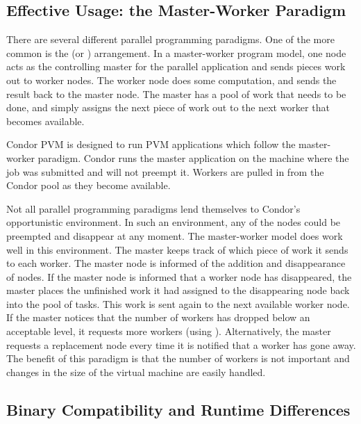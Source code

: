 \subsection{Effective Usage: the Master-Worker Paradigm}

There are several different parallel programming paradigms.  One of the
more common is the  (or )
arrangement.  In a master-worker program model, one node acts as the
controlling master for the parallel application and sends pieces work 
out to worker nodes.
The worker node does some computation, and sends the result back to the
master node.  The master has a pool of work that needs to be
done, and simply assigns the next piece of work out to the next worker
that becomes available.  

Condor PVM is designed to run PVM applications which follow the
master-worker paradigm.  Condor runs the master application on the
machine where the job was submitted and will not preempt it.  Workers
are pulled in from the Condor pool as they become available.

Not all parallel programming paradigms lend themselves to Condor's
opportunistic environment. In such an environment, any of the nodes
could be preempted and disappear at any moment.
The master-worker model does work well in this environment.
The master keeps track of which piece of work it
sends to each worker. The master node is informed of
the addition and disappearance of nodes.
If the master node is informed that a worker node
has disappeared, the master places the unfinished work it had assigned
to the disappearing node
back into the pool of tasks.
This work is sent again to the next
available worker node.
If the master notices that the number of workers has
dropped below an acceptable level, it requests more workers
(using ).
Alternatively, the master requests
a replacement node every time it is notified that a worker has
gone away. The benefit of this paradigm is that the number of workers is
not important and changes in the size of
the virtual machine are easily handled.

\subsection{Binary Compatibility and Runtime Differences}

